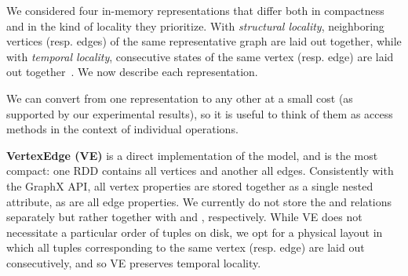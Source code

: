 We considered four in-memory \tg representations that differ both in
compactness and in the kind of locality they prioritize. With {\em
  structural locality}, neighboring vertices (resp. edges) of the same
representative graph are laid out together, while with {\em temporal
  locality}, consecutive states of the same vertex (resp. edge) are
laid out together~\cite{Miao2015}.  We now
describe each representation.

We can convert from one representation to any other at a small cost
(as supported by our experimental results), so it is useful to think
of them as access methods in the context of individual operations.

{\bf VertexEdge (VE)} is a direct implementation of the \tve model,
and is the most compact: one RDD contains all vertices and another all
edges.  Consistently with the GraphX API, all vertex properties are
stored together as a single nested attribute, as are all edge
properties.  We currently do not store the \tv and \te relations
separately but rather together with \tav and \tae, respectively.
While VE does not necessitate a particular order of tuples on disk, we
opt for a physical layout in which all tuples corresponding to the
same vertex (resp. edge) are laid out consecutively, and so VE
preserves temporal locality.


